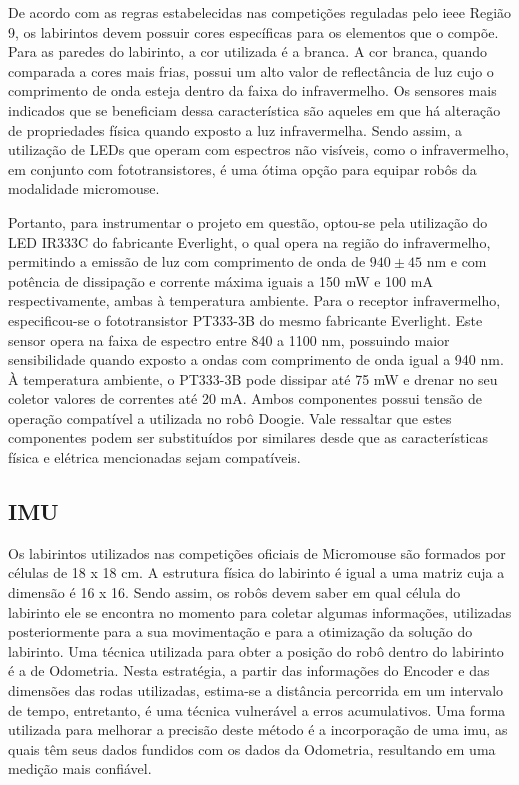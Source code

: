 De acordo com as regras estabelecidas nas competições reguladas pelo \gls*{ieee} Região 9, os labirintos devem possuir cores específicas para os elementos que o compõe. Para as paredes do labirinto, a cor utilizada é a branca. A cor branca, quando comparada a cores mais frias, possui um alto valor de reflectância de luz cujo o comprimento de onda esteja dentro da faixa do infravermelho. Os sensores mais indicados que se beneficiam dessa característica são aqueles em que há alteração de propriedades física quando exposto a luz infravermelha. Sendo assim, a utilização de LEDs que operam com espectros não visíveis, como o infravermelho, em conjunto com fototransistores, é uma ótima opção para equipar robôs da modalidade micromouse.

Portanto, para instrumentar o projeto em questão, optou-se pela utilização do LED IR333C do fabricante Everlight, o qual opera na região do infravermelho, permitindo a emissão de luz com comprimento de onda de $940 \pm 45$ nm e com potência de dissipação e corrente máxima iguais a 150 mW e 100 mA respectivamente, ambas à temperatura ambiente. Para o receptor infravermelho, especificou-se o fototransistor PT333-3B do mesmo fabricante Everlight. Este sensor opera na faixa de espectro entre 840 a 1100 nm, possuindo maior sensibilidade quando exposto a ondas com comprimento de onda igual a 940 nm. À temperatura ambiente, o PT333-3B pode dissipar até 75 mW e drenar no seu coletor valores de correntes até 20 mA. Ambos componentes possui tensão de operação compatível a utilizada no robô Doogie. Vale ressaltar que estes componentes podem ser substituídos por similares desde que as características física e elétrica mencionadas sejam compatíveis.

\subsection{IMU}
\label{ssec:imu}
Os labirintos utilizados nas competições oficiais de Micromouse são formados por células de 18 x 18 cm. A estrutura física do labirinto é igual a uma matriz cuja a dimensão é 16 x 16. Sendo assim, os robôs devem saber em qual célula do labirinto ele se encontra no momento para coletar algumas informações, utilizadas posteriormente para a sua movimentação e para a otimização da solução do labirinto. Uma técnica utilizada para obter a posição do robô dentro do labirinto é a de Odometria. Nesta estratégia, a partir das informações do Encoder e das dimensões das rodas utilizadas, estima-se a distância percorrida em um intervalo de tempo, entretanto, é uma técnica vulnerável a erros acumulativos. Uma forma utilizada para melhorar a precisão deste método é a incorporação de uma \gls*{imu}, as quais têm seus dados fundidos com os dados da Odometria, resultando em uma medição mais confiável.

